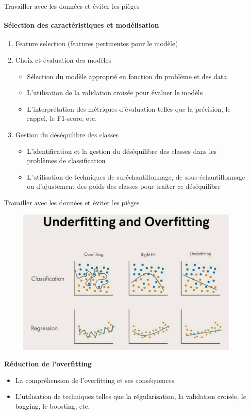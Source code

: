 \documentclass{beamer}
\begin{document}
\begin{frame}{Travailler avec les données et éviter les pièges}
	\framesubtitle{Sélection des caractéristiques et modélisation}
	\begin{enumerate}
		\item Feature selection (features pertinentes pour le modèle)
		\item Choix et évaluation des modèles
			\begin{itemize}
				\item Sélection du modèle approprié en fonction du problème et des data
				\item L'utilisation de la validation croisée pour évaluer le modèle
				\item L'interprétation des métriques d'évaluation telles que la précision, le rappel, le F1-score, etc.
			\end{itemize}
		\item Gestion du déséquilibre des classes 
		   \begin{itemize}
		   	\item L'identification et la gestion du déséquilibre des classes dans les problèmes de classification
		    \item 	L'utilisation de techniques de suréchantillonnage, de sous-échantillonnage ou d'ajustement des poids des classes pour traiter ce déséquilibre
		   \end{itemize}
			
	\end{enumerate}
\end{frame}


		\begin{frame}{Travailler avec les données et éviter les pièges}
			
	\centering
	\begin{figure}[h]
		\includegraphics[width=0.75\linewidth]{OverUnderFit.jpeg}
	\end{figure}
\textbf{	Réduction de l'overfitting }
\begin{itemize}
	\item La compréhension de l'overfitting et ses conséquences
	\item L'utilisation de techniques telles que la régularisation, la validation croisée, le bagging, le boosting, etc.
\end{itemize}
\end{frame}
\end{document}
